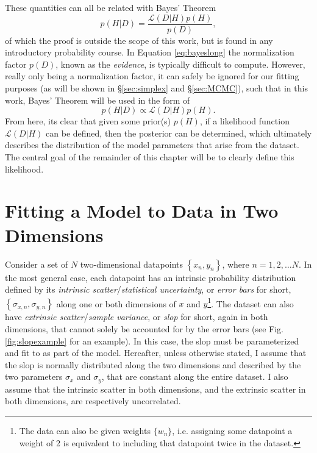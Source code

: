 These quantities can all be related with Bayes' Theorem
\begin{equation}\label{eq:bayeslong}
     p(H|D)=\frac{\mathcal{L}(D|H)p(H)}{p(D)},
\end{equation}
of which the proof is outside the scope of this work, but is found in any introductory probability course. In Equation \eqref{eq:bayeslong} the normalization factor $p(D)$, known as the \textit{evidence}, is typically difficult to compute. However, really only being a normalization factor, it can safely be ignored for our fitting purposes (as will be shown in \S\ref{sec:simplex} and \S\ref{sec:MCMC}), such that in this work, Bayes' Theorem will be used in the form of 
\begin{equation}\label{eq:bayes}
     p(H|D)\propto\mathcal{L}(D|H)p(H).
\end{equation}
From here, its clear that given some prior(s) $p(H)$, if a likelihood function $\mathcal{L}(D|H)$ can be defined, then the posterior can be determined, which ultimately describes the distribution of the model parameters that arise from the dataset. The central goal of the remainder of this chapter will be to clearly define this likelihood.

\section{Fitting a Model to Data in Two Dimensions}
\label{sec:2dmodelfitting}
Consider a set of $N$ two-dimensional datapoints $\left\{x_n, y_n\right\}$, where $n = 1, 2, \ldots N$. In the most general case, each datapoint has an intrinsic probability distribution defined by its \textit{intrinsic scatter}/\textit{statistical uncertainty}, or \textit{error bars} for short, $\left\{\sigma_{x,n}, \sigma_{y,n}\right\}$ along one or both dimensions of $x$ and $y$\footnote{The data can also be given weights $\{w_n\}$, i.e. assigning some datapoint a weight of 2 is equivalent to including that datapoint twice in the dataset.}. The dataset can also have \textit{extrinsic scatter}/\textit{sample variance}, or \textit{slop} for short, again in both dimensions, that cannot solely be accounted for by the error bars (see Fig. \ref{fig:slopexample} for an example). In this case, the slop must be parameterized and fit to as part of the model. Hereafter, unless otherwise stated, I assume that the slop is normally distributed along the two dimensions and described by the two parameters $\sigma_x$ and $\sigma_y$, that are constant along the entire dataset. I also assume that the intrinsic scatter in both dimensions, and the extrinsic scatter in both dimensions, are respectively uncorrelated.

